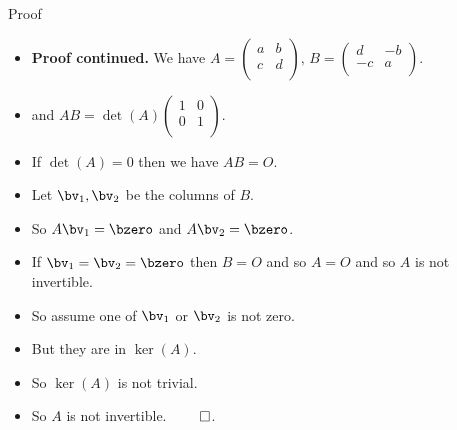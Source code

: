 \documentclass{beamer}
\begin{document}
\begin{frame}{Proof}

\begin{itemize}
\item \textbf{Proof continued.} We have
$A=
\begin{pmatrix}
a & b  \\
c & d  \\
\end{pmatrix}
\text{, }
B=
\begin{pmatrix}
d & -b  \\
-c & a  \\
\end{pmatrix}.
$
\item and
$AB = \det(A)
\begin{pmatrix}
1 & 0  \\
0 & 1  \\
\end{pmatrix}
$.
\item If $\det(A)=0$ then we have $AB=O$.
\item Let $\bv_1,\bv_2$ be the columns of $B$.
\item So $A\bv_1 = \bzero$ and $A\bv_2 = \bzero$.
\item If $\bv_1=\bv_2=\bzero$ then $B=O$ and so $A=O$ and
so $A$ is not invertible.
\item So assume one of $\bv_1$ or $\bv_2$ is not zero.
\item But they are in $\ker(A)$.
\item So $\ker(A)$ is not trivial.
\item So $A$ is not invertible. $\qed$.
\end{itemize}
\end{frame}
\end{document}
